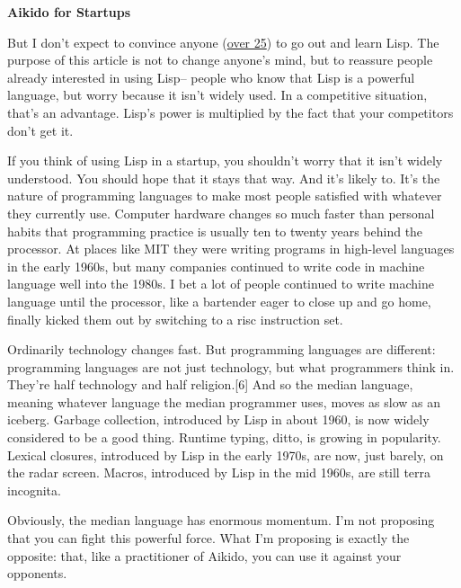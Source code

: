 \textbf{Aikido for Startups}

But I
                  don't expect to convince anyone (\href{http://www.trollope.org/scheme.html}{over 25}) to go out and learn Lisp. The purpose of this article is
                  not to change anyone's mind, but to reassure people already
                  interested in using Lisp-- people who know that Lisp is a
                  powerful language, but worry because it isn't widely used. In
                  a competitive situation, that's an advantage. Lisp's power is
                  multiplied by the fact that your competitors don't get it.

If
                  you think of using Lisp in a startup, you shouldn't worry that
                  it isn't widely understood. You should hope that it stays that
                  way. And it's likely to. It's the nature of programming
                  languages to make most people satisfied with whatever they
                  currently use. Computer hardware changes so much faster than
                  personal habits that programming practice is usually ten to
                  twenty years behind the processor. At places like MIT they
                  were writing programs in high-level languages in the early
                  1960s, but many companies continued to write code in machine
                  language well into the 1980s. I bet a lot of people continued
                  to write machine language until the processor, like a
                  bartender eager to close up and go home, finally kicked them
                  out by switching to a risc instruction set.

Ordinarily
                  technology changes fast. But programming languages are
                  different: programming languages are not just technology, but
                  what programmers think in. They're half technology and half
                  religion.[6] And so the median language, meaning whatever
                  language the median programmer uses, moves as slow as an
                  iceberg. Garbage collection, introduced by Lisp in about 1960,
                  is now widely considered to be a good thing. Runtime typing,
                  ditto, is growing in popularity. Lexical closures, introduced
                  by Lisp in the early 1970s, are now, just barely, on the radar
                  screen. Macros, introduced by Lisp in the mid 1960s, are still
                  terra incognita.

Obviously, the median language has
                  enormous momentum. I'm not proposing that you can fight this
                  powerful force. What I'm proposing is exactly the opposite:
                  that, like a practitioner of Aikido, you can use it against
                  your opponents.

